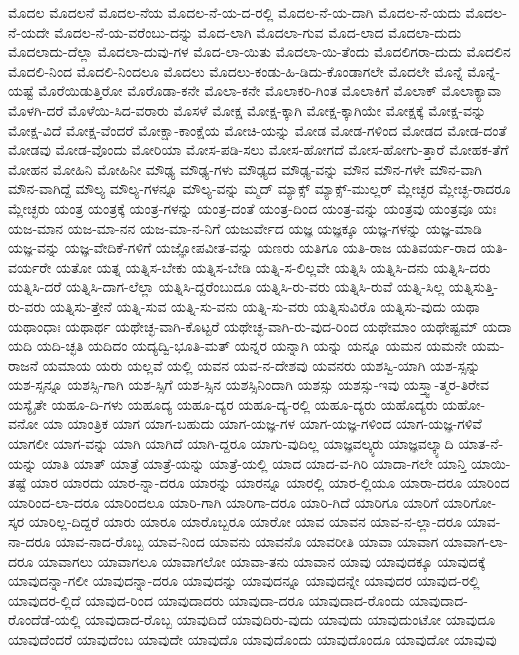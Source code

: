 {ಮೊದಲ
ಮೊದಲನೆ
ಮೊದಲ-ನೆಯ
ಮೊದಲ-ನೆ-ಯ-ದ-ರಲ್ಲಿ
ಮೊದಲ-ನೆ-ಯ-ದಾಗಿ
ಮೊದಲ-ನೆ-ಯದು
ಮೊದಲ-ನೆ-ಯದೇ
ಮೊದಲ-ನೆ-ಯ-ವರೆಂಬು-ದನ್ನು
ಮೊದ-ಲಾಗಿ
ಮೊದಲಾ-ಗುವ
ಮೊದ-ಲಾದ
ಮೊದಲಾ-ದುದು
ಮೊದಲಾದು-ದೆಲ್ಲಾ
ಮೊದಲಾ-ದುವು-ಗಳ
ಮೊದ-ಲಾ-ಯಿತು
ಮೊದಲಾ-ಯಿ-ತೆಂದು
ಮೊದಲಿಗರಾ-ದುದು
ಮೊದಲಿನ
ಮೊದಲಿ-ನಿಂದ
ಮೊದಲಿ-ನಿಂದಲೂ
ಮೊದಲು
ಮೊದಲು-ಕಂಡು-ಹಿ-ಡಿದು-ಕೊಂಡಾಗಲೇ
ಮೊದಲೇ
ಮೊನ್ನೆ
ಮೊನ್ನೆ-ಯಷ್ಟೆ
ಮೊರೆಯಿಡುತ್ತಿರೋ
ಮೊರೊಡಾ-ಕನೇ
ಮೊಲಾ-ಕನೇ
ಮೊಲಾಕರಿ-ಗಿಂತ
ಮೊಲಾಕಿಗೆ
ಮೊಲಾಕ್
ಮೊಲಾಕ್ಯಾವಾ
ಮೊಳಗಿ-ದರೆ
ಮೊಳೆಯಿ-ಸಿದ-ವರಾರು
ಮೊಸಳೆ
ಮೋಕ್ಷ
ಮೋಕ್ಷ-ಕ್ಕಾಗಿ
ಮೋಕ್ಷ-ಕ್ಕಾಗಿಯೇ
ಮೋಕ್ಷಕ್ಕೆ
ಮೋಕ್ಷ-ವನ್ನು
ಮೋಕ್ಷ-ವಿದೆ
ಮೋಕ್ಷ-ವೆಂದರೆ
ಮೋಕ್ಷಾ-ಕಾಂಕ್ಷೆಯ
ಮೋಚಿ-ಯನ್ನು
ಮೋಡ
ಮೋಡ-ಗಳಿಂದ
ಮೋಡದ
ಮೋಡ-ದಂತೆ
ಮೋಡವು
ಮೋಡ-ವೊಂದು
ಮೋರಿಯಾ
ಮೋಸ-ಪಡಿ-ಸಲು
ಮೋಸ-ಹೋಗದೆ
ಮೋಸ-ಹೋಗು-ತ್ತಾರೆ
ಮೋಹಕ-ತೆಗೆ
ಮೋಹನ
ಮೋಹಿನಿ
ಮೋಹಿನೀ
ಮೌಢ್ಯ
ಮೌಢ್ಯ-ಗಳು
ಮೌಢ್ಯದ
ಮೌಢ್ಯ-ವನ್ನು
ಮೌನ
ಮೌನ-ಗಳೇ
ಮೌನ-ವಾಗಿ
ಮೌನ-ವಾಗಿದ್ದೆ
ಮೌಲ್ಯ
ಮೌಲ್ಯ-ಗಳನ್ನೂ
ಮೌಲ್ಯ-ವನ್ನು
ಮ್ಮದ್
ಮ್ಯಾಕ್ಸ್
ಮ್ಯಾಕ್ಸ್-ಮುಲ್ಲರ್
ಮ್ಲೇಚ್ಛರ
ಮ್ಲೇಚ್ಛ-ರಾದರೂ
ಮ್ಲೇಚ್ಛರು
ಯಂತ್ರ
ಯಂತ್ರಕ್ಕೆ
ಯಂತ್ರ-ಗಳನ್ನು
ಯಂತ್ರ-ದಂತೆ
ಯಂತ್ರ-ದಿಂದ
ಯಂತ್ರ-ವನ್ನು
ಯಂತ್ರವು
ಯಂತ್ರವೂ
ಯಃ
ಯಜ-ಮಾನ
ಯಜ-ಮಾ-ನನ
ಯಜ-ಮಾ-ನ-ನಿಗೆ
ಯಜುರ್ವೇದ
ಯಜ್ಞ
ಯಜ್ಞಕ್ಕೂ
ಯಜ್ಞ-ಗಳನ್ನು
ಯಜ್ಞ-ಮಾಡಿ
ಯಜ್ಞ-ವನ್ನು
ಯಜ್ಞ-ವೇದಿಕೆ-ಗಳಿಗೆ
ಯಜ್ಞೋಪವೀತ-ವನ್ನು
ಯಣರು
ಯತಿಗೂ
ಯತಿ-ರಾಜ
ಯತಿವರ್ಯ-ರಾದ
ಯತಿ-ವರ್ಯರೇ
ಯತೋ
ಯತ್ನ
ಯತ್ನಿಸ-ಬೇಕು
ಯತ್ನಿಸ-ಬೇಡಿ
ಯತ್ನಿ-ಸ-ಲಿಲ್ಲವೇ
ಯತ್ನಿಸಿ
ಯತ್ನಿಸಿ-ದನು
ಯತ್ನಿಸಿ-ದರು
ಯತ್ನಿಸಿ-ದರೆ
ಯತ್ನಿಸಿ-ದಾಗ-ಲೆಲ್ಲಾ
ಯತ್ನಿಸಿ-ದ್ದರೆಂಬುದೂ
ಯತ್ನಿಸಿ-ರು-ವರು
ಯತ್ನಿಸಿ-ರುವೆ
ಯತ್ನಿ-ಸಿಲ್ಲ
ಯತ್ನಿಸುತ್ತಿ-ರು-ವರು
ಯತ್ನಿಸು-ತ್ತೇನೆ
ಯತ್ನಿ-ಸುವ
ಯತ್ನಿ-ಸು-ವನು
ಯತ್ನಿ-ಸು-ವರು
ಯತ್ನಿಸುವಿರೊ
ಯತ್ನಿಸು-ವುದು
ಯಥಾ
ಯಥಾಂಧಾಃ
ಯಥಾರ್ಥ
ಯಥೇಚ್ಛ-ವಾಗಿ-ಕೊಟ್ಟರೆ
ಯಥೇಚ್ಛ-ವಾಗಿ-ರು-ವುದ-ರಿಂದ
ಯಥೇಮಾಂ
ಯಥೇಷ್ಟಮ್
ಯದಾ
ಯದಿ
ಯದಿ-ಚ್ಛತಿ
ಯದಿದಂ
ಯದ್ಯದ್ವಿ-ಭೂತಿ-ಮತ್
ಯನ್ನರ
ಯನ್ನಾಗಿ
ಯನ್ನು
ಯನ್ನೂ
ಯಮನ
ಯಮನೇ
ಯಮ-ರಾಜನೆ
ಯಮಾಯ
ಯರು
ಯಲ್ಲವೆ
ಯಲ್ಲಿ
ಯವನ
ಯವ-ನ-ದೇಶವು
ಯವನರು
ಯಶಸ್ವಿ-ಯಾಗಿ
ಯಶ-ಸ್ಸನ್ನು
ಯಶ-ಸ್ಸನ್ನೂ
ಯಶಸ್ಸಿ-ಗಾಗಿ
ಯಶ-ಸ್ಸಿಗೆ
ಯಶ-ಸ್ಸಿನ
ಯಶಸ್ಸಿನಿಂದಾಗಿ
ಯಶಸ್ಸು
ಯಶಸ್ಸು-ಇವು
ಯಸ್ತ್ವಾ-ತ್ಮರ-ತಿರೇವ
ಯಸ್ಯೈತೇ
ಯಹೂ-ದಿ-ಗಳು
ಯಹೂದ್ಯ
ಯಹೂ-ದ್ಯರ
ಯಹೂ-ದ್ಯ-ರಲ್ಲಿ
ಯಹೂ-ದ್ಯರು
ಯಹೊದ್ಯರು
ಯಹೋ-ವನೋ
ಯಾ
ಯಾಂತ್ರಿಕ
ಯಾಗ
ಯಾಗ-ಬಹುದು
ಯಾಗ-ಯಜ್ಞ-ಗಳ
ಯಾಗ-ಯಜ್ಞ-ಗಳಿಂದ
ಯಾಗ-ಯಜ್ಞ-ಗಳಿವೆ
ಯಾಗಲೀ
ಯಾಗ-ವನ್ನು
ಯಾಗಿ
ಯಾಗಿದೆ
ಯಾಗಿ-ದ್ದರೂ
ಯಾಗು-ವುದಿಲ್ಲ
ಯಾಜ್ಞವಲ್ಕ್ಯರು
ಯಾಜ್ಞವಲ್ಕ್ಯಾದಿ
ಯಾತ-ನೆ-ಯನ್ನು
ಯಾತಿ
ಯಾತ್
ಯಾತ್ರೆ
ಯಾತ್ರೆ-ಯನ್ನು
ಯಾತ್ರೆ-ಯಲ್ಲಿ
ಯಾದ
ಯಾದ-ವ-ಗಿರಿ
ಯಾದಾ-ಗಲೇ
ಯಾನ್ತಿ
ಯಾಯಿ-ತಷ್ಟೆ
ಯಾರ
ಯಾರದು
ಯಾರ-ನ್ನಾ-ದರೂ
ಯಾರನ್ನು
ಯಾರನ್ನೂ
ಯಾರಲ್ಲಿ
ಯಾರ-ಲ್ಲಿಯೂ
ಯಾರಾ-ದರೂ
ಯಾರಿಂದ
ಯಾರಿಂದ-ಲಾ-ದರೂ
ಯಾರಿಂದಲೂ
ಯಾರಿ-ಗಾಗಿ
ಯಾರಿಗಾ-ದರೂ
ಯಾರಿ-ಗಿದೆ
ಯಾರಿಗೂ
ಯಾರಿಗೆ
ಯಾರಿಗೋ-ಸ್ಕರ
ಯಾರಿಲ್ಲ-ದಿದ್ದರೆ
ಯಾರು
ಯಾರೂ
ಯಾರೊಬ್ಬರೂ
ಯಾರೋ
ಯಾವ
ಯಾವನ
ಯಾವ-ನ-ಲ್ಲಾ-ದರೂ
ಯಾವ-ನಾ-ದರೂ
ಯಾವ-ನಾದ-ರೊಬ್ಬ
ಯಾವ-ನಿಂದ
ಯಾವನು
ಯಾವನೊ
ಯಾವರೀತಿ
ಯಾವಾ
ಯಾವಾಗ
ಯಾವಾಗ-ಲಾ-ದರೂ
ಯಾವಾಗಲು
ಯಾವಾಗಲೂ
ಯಾವಾಗಲೋ
ಯಾವಾ-ತನು
ಯಾವಾನ
ಯಾವು
ಯಾವುದಕ್ಕೂ
ಯಾವುದಕ್ಕೆ
ಯಾವುದನ್ನಾ-ಗಲೀ
ಯಾವುದನ್ನಾ-ದರೂ
ಯಾವುದನ್ನು
ಯಾವುದನ್ನೂ
ಯಾವುದನ್ನೇ
ಯಾವುದರ
ಯಾವುದ-ರಲ್ಲಿ
ಯಾವುದರ-ಲ್ಲಿದೆ
ಯಾವುದ-ರಿಂದ
ಯಾವುದಾದರು
ಯಾವುದಾ-ದರೂ
ಯಾವುದಾದ-ರೊಂದು
ಯಾವುದಾದ-ರೊಂದೆಡೆ-ಯಲ್ಲಿ
ಯಾವುದಾದ-ರೊಬ್ಬ
ಯಾವುದಿದೆ
ಯಾವುದಿರು-ವುದು
ಯಾವುದು
ಯಾವುದುಂಟೋ
ಯಾವುದೂ
ಯಾವುದೆಂದರೆ
ಯಾವುದೆಂಬ
ಯಾವುದೇ
ಯಾವುದೊ
ಯಾವುದೊಂದು
ಯಾವುದೊಂದೂ
ಯಾವುದೋ
ಯಾವುವು
}
